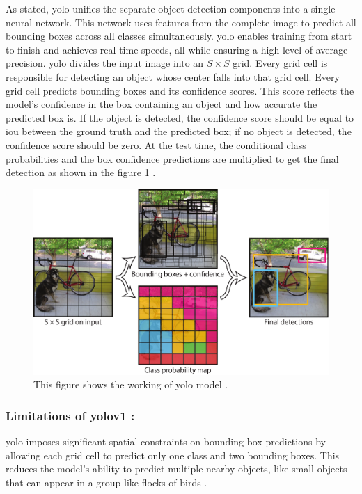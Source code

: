 As stated, \gls{yolo} unifies the separate object detection components into a single neural network. This network uses features from the complete image to predict all bounding boxes across all classes simultaneously. \gls{yolo} enables training from start to finish and achieves real-time speeds, all while ensuring a high level of average precision. \gls{yolo} divides the input image into an $S\times S$ grid. Every grid cell is responsible for detecting an object whose center falls into that grid cell. Every grid cell predicts bounding boxes and its confidence scores. This score reflects the model's confidence in the box containing an object and how accurate the predicted box is. If the object is detected, the confidence score should be equal to \gls{iou} between the ground truth and the predicted box; if no object is detected, the confidence score should be zero. At the test time, the conditional class probabilities and the box confidence predictions are multiplied to get the final detection as shown in the figure \ref{fig:yolo model} \cite{redmon2016you}.

\begin{figure}[H]
    \centering
    \includegraphics[width=1\linewidth]{Rohit_Master_Thesis//Images/yolo_model.pdf}
    \caption{This figure shows the working of \gls{yolo} model \cite{redmon2016you}.}
    \label{fig:yolo model}
\end{figure}

\subsubsection*{Limitations of \gls{yolo}v1 :} 

\gls{yolo} imposes significant spatial constraints on bounding box predictions by allowing each grid cell to predict only one class and two bounding boxes. This reduces the model's ability to predict multiple nearby objects, like small objects that can appear in a group like flocks of birds \cite{redmon2016you}.

